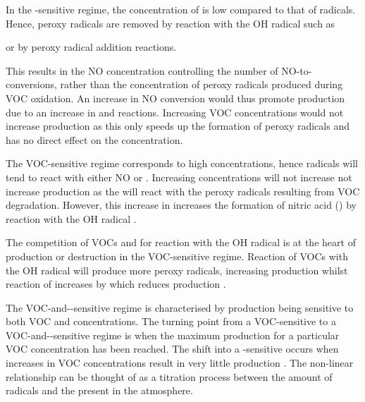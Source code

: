 In the -sensitive regime, the concentration of  is low compared to that of radicals. 
Hence, peroxy radicals are removed by reaction with the OH radical such as 
\begin{reactionlist}
\end{reactionlist}
or by peroxy radical addition reactions.
\begin{reactionlist}
\end{reactionlist}
This results in the NO concentration controlling the number of NO-to- conversions, rather than the concentration of peroxy radicals produced during VOC oxidation. 
An increase in NO conversion would thus promote  production due to an increase in  and  reactions. 
Increasing VOC concentrations would not increase  production as this only speeds up the formation of peroxy radicals and has no direct effect on the  concentration.

The VOC-sensitive regime corresponds to high  concentrations, hence radicals will tend to react with either NO or . 
Increasing  concentrations will not increase not increase  production as the  will react with the peroxy radicals resulting from VOC degradation. 
However, this increase in  increases the formation of nitric acid () by reaction with the OH radical \citep{Kleinman:1991, Kleinman:1994, Kirchner:2001}.
\begin{reactionlist}
\end{reactionlist}
The competition of VOCs and  for reaction with the OH radical is at the heart of  production or destruction in the VOC-sensitive regime. 
Reaction of VOCs with the OH radical will produce more peroxy radicals, increasing  production whilst reaction of  increases  by  which reduces  production \citep{Kleinman:1991, Kleinman:1994, Kirchner:2001}.

The VOC-and--sensitive regime is characterised by  production being sensitive to both VOC and  concentrations. 
The turning point from a VOC-sensitive to a VOC-and--sensitive regime is when the maximum  production for a particular VOC concentration has been reached. 
The shift into a -sensitive occurs when increases in VOC concentrations result in very little  production \citep{Kirchner:2001}. 
The non-linear relationship can be thought of as a titration process between the amount of radicals and the  present in the atmosphere.

